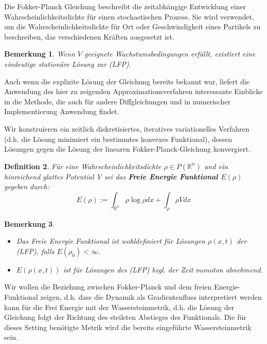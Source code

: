 \documentclass[11pt,a4paper,notitlepage]{scrreprt}
\newcommand{\RR}{\mathbb{R}}
\newtheorem{defi}{Definition}[section]
\newtheorem{bem}[defi]{Bemerkung}
\begin{document}
Die Fokker-Planck Gleichung beschreibt die zeitabhängige Entwicklung einer Wahrscheinlichkeitsdichte für einen stochastischen Prozess. Sie wird verwendet, um die Wahrscheinlichkeitsdichte für Ort oder Geschwindigkeit eines Partikels zu beschreiben, das verschiedenen Kräften ausgesetzt ist.

\begin{bem}
Wenn $V$ geeignete Wachstumsbedingungen erfüllt, existiert eine eindeutige stationäre Lösung zur (LFP).
\end{bem}
Auch wenn die explizite Lösung der Gleichung bereits bekannt war, liefert die Anwendung des hier zu zeigenden Approximationsverfahren interessante Einblicke in die Methode, die auch für andere Diffgleichungen und in numerischer Implementierung Anwendung findet. 


Wir konstruieren ein zeitlich diskretisiertes, iteratives variationelles Verfahren (d.h. die Lösung minimiert ein bestimmtes konvexes Funktional), dessen Lösungen gegen die Lösung der linearen Fokker-Planck-Gleichung konvergiert.

\begin{defi}
Für eine Wahrscheinlichkeitsdichte $\rho\in P(\RR^n)$ und ein hinreichend glattes Potential V sei das \textbf{Freie Energie Funktional $E(\rho)$} gegeben durch:
\begin{equation}
E(\rho):=\int_{\RR^n} \rho\log\rho dx + \int_{\rho}\rho V dx \label{FEFktn}
\end{equation}
\end{defi}

\begin{bem}
\begin{itemize}
\item Das Freie Energie Funktional ist wohldefiniert für Lösungen $\rho(x,t)$ der (LFP), falls $E(\rho_0)<\infty$.
\item $E(\rho(x,t))$ ist für Lösungen des (LFP) bzgl. der Zeit monoton abnehmend.\end{itemize}
\end{bem}

Wir wollen die Beziehung zwischen Fokker-Planck und dem freien Energie-Funktional zeigen, d.h. dass die Dynamik als Gradientenfluss interpretiert werden kann für die Frei Energie mit der Wassersteinmetrik, d.h. die Lösung der Gleichung folgt der Richtung des steilsten Abstieges des Funktionals. Die für dieses Setting benötigte Metrik wird die bereits eingeführte Wassersteinmetrik sein. \\
\end{document}

